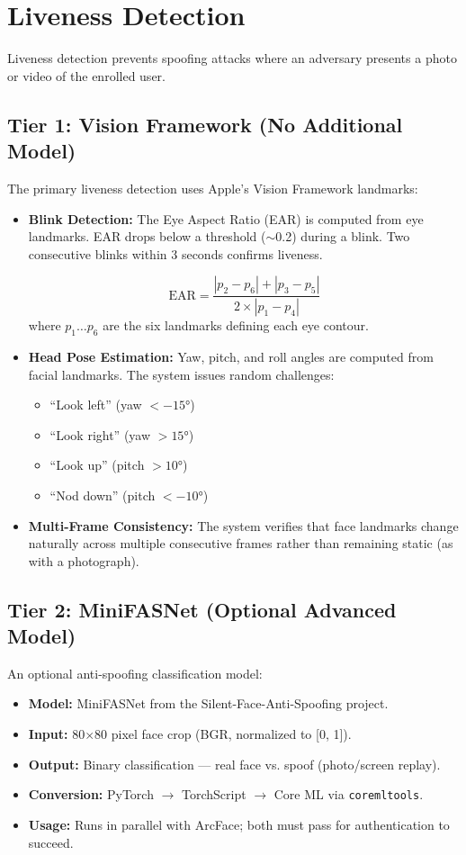 \documentclass[12pt,a4paper]{report}
\begin{document}
\section{Liveness Detection}
Liveness detection prevents spoofing attacks where an adversary presents a photo or video of the enrolled user.

\subsection{Tier 1: Vision Framework (No Additional Model)}
The primary liveness detection uses Apple's Vision Framework landmarks:

\begin{itemize}
    \item \textbf{Blink Detection:} The Eye Aspect Ratio (EAR) is computed from eye landmarks. EAR drops below a threshold ($\sim$0.2) during a blink. Two consecutive blinks within 3 seconds confirms liveness.
    
    \[
    \text{EAR} = \frac{|p_2 - p_6| + |p_3 - p_5|}{2 \times |p_1 - p_4|}
    \]
    where $p_1 \ldots p_6$ are the six landmarks defining each eye contour.
    
    \item \textbf{Head Pose Estimation:} Yaw, pitch, and roll angles are computed from facial landmarks. The system issues random challenges:
    \begin{itemize}[noitemsep]
        \item ``Look left'' (yaw $< -15°$)
        \item ``Look right'' (yaw $> 15°$)
        \item ``Look up'' (pitch $> 10°$)
        \item ``Nod down'' (pitch $< -10°$)
    \end{itemize}
    
    \item \textbf{Multi-Frame Consistency:} The system verifies that face landmarks change naturally across multiple consecutive frames rather than remaining static (as with a photograph).
\end{itemize}

\subsection{Tier 2: MiniFASNet (Optional Advanced Model)}
An optional anti-spoofing classification model:

\begin{itemize}[noitemsep]
    \item \textbf{Model:} MiniFASNet from the Silent-Face-Anti-Spoofing project.
    \item \textbf{Input:} 80$\times$80 pixel face crop (BGR, normalized to [0, 1]).
    \item \textbf{Output:} Binary classification — real face vs. spoof (photo/screen replay).
    \item \textbf{Conversion:} PyTorch $\rightarrow$ TorchScript $\rightarrow$ Core ML via \texttt{coremltools}.
    \item \textbf{Usage:} Runs in parallel with ArcFace; both must pass for authentication to succeed.
\end{itemize}
\end{document}
